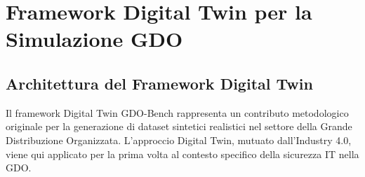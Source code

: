 \appendix
\chapter{\texorpdfstring{Framework Digital Twin per la Simulazione GDO}{Appendice B - Framework Digital Twin per la Simulazione GDO}}
\label{app:digital-twin}

\section{\texorpdfstring{Architettura del Framework Digital Twin}{B.1 - Architettura del Framework Digital Twin}}


Il framework Digital Twin GDO-Bench rappresenta un contributo metodologico originale per la generazione di dataset sintetici realistici nel settore della Grande Distribuzione Organizzata. L'approccio Digital Twin, mutuato dall'Industry 4.0\autocite{tao2019digital}, viene qui applicato per la prima volta al contesto specifico della sicurezza IT nella GDO.
